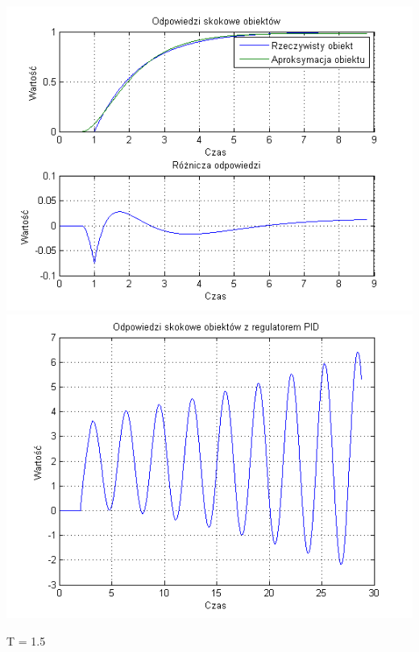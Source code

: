 \documentclass[10pt,a4paper]{article}
\begin{document}
\begin{center}
\includegraphics[scale=1]{images/dwa/skrypt_17.png}\\
\includegraphics[scale=1]{images/dwa/skrypt_18.png}\\
\end{center}
\newpage
T = 1.5
\end{document}

